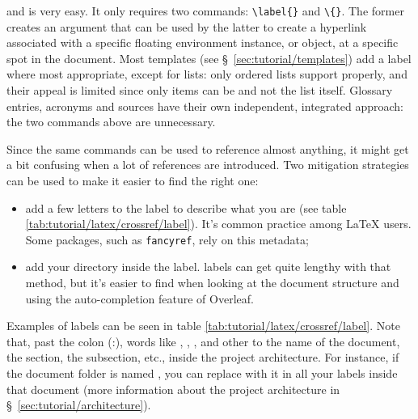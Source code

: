 and  is very easy. It only requires two \glspl{command}: \texttt{\textbackslash{}\gls{label}\{\}} and \texttt{\textbackslash{}\{\}}. The former creates an \gls{argument} that can be used by the latter to create a \gls{hyperlink} associated with a specific floating \gls{environment} instance, or object, at a specific spot in the document. Most templates (see \S~\ref{sec:tutorial/templates}) add a \gls{label} where most appropriate, except for lists: only ordered lists support  properly, and their appeal is limited since only items can be  and not the list itself. Glossary entries, acronyms and \glspl{source} have their own independent, integrated approach: the two \glspl{command} above are unnecessary.

Since the same \glspl{command} can be used to \gls{reference} almost anything, it might get a bit confusing when a lot of \glspl{reference} are introduced. Two mitigation strategies can be used to make it easier to find the right one:
\begin{itemize}
    \item add a few letters to the \gls{label} to describe what you are  (see table \ref{tab:tutorial/latex/crossref/label}). It's common practice among \LaTeX{} users. Some \glspl{package}, such as \texttt{fancyref}, rely on this metadata;
    \item add your directory inside the \gls{label}. \Glspl{label} can get quite lengthy with that method, but it's easier to find when looking at the document structure and using the auto-completion feature of Overleaf.
\end{itemize}

Examples of \glspl{label} can be seen in table \ref{tab:tutorial/latex/crossref/label}. Note that, past the colon (:), words like , , , and other  to the name of the document, the section, the subsection, etc., inside the project architecture. For instance, if the document folder is named , you can replace  with it in all your \glspl{label} inside that document (more information about the project architecture in \S~\ref{sec:tutorial/architecture}).

\begingroup
    \setlength{\columnA}{\dimexpr \linewidth/8}
    \setlength{\columnB}{\dimexpr \columnA}
    \setlength{\columnC}{\dimexpr \linewidth-\columnA-\columnB}
    
